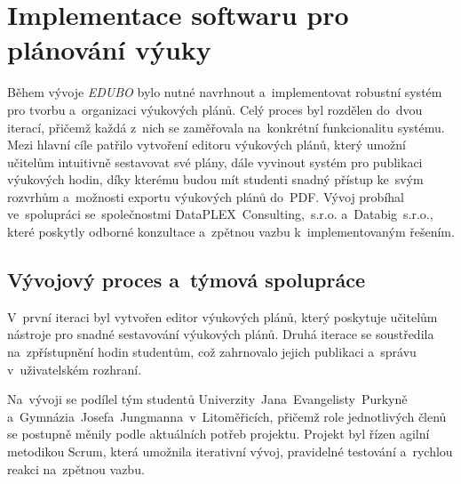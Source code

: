 \documentclass[male,czech,api_bc]{kitheses}
\begin{document}
\section{Implementace softwaru pro plánování výuky}

Během vývoje \textit{EDUBO} bylo nutné navrhnout a~implementovat robustní systém pro tvorbu a~organizaci výukových plánů. Celý proces byl rozdělen do~dvou iterací, přičemž každá z~nich se zaměřovala na~konkrétní funkcionalitu systému. Mezi hlavní cíle patřilo vytvoření editoru výukových plánů, který umožní učitelům intuitivně sestavovat své plány, dále vyvinout systém pro publikaci výukových hodin, díky kterému budou mít studenti snadný přístup ke~svým rozvrhům a~možnosti exportu výukových plánů do~PDF. Vývoj probíhal ve~spolupráci se~společnostmi DataPLEX~Consulting,~s.r.o. a~Databig~s.r.o., které poskytly odborné konzultace a~zpětnou vazbu k~implementovaným řešením.

\subsection{Vývojový proces a~týmová spolupráce}

V~první iteraci byl vytvořen editor výukových plánů, který poskytuje učitelům nástroje pro snadné sestavování výukových plánů. Druhá iterace se soustředila na~zpřístupnění hodin studentům, což zahrnovalo jejich publikaci a~správu v~uživatelském rozhraní.

Na~vývoji se podílel tým studentů Univerzity~Jana~Evangelisty~Purkyně a~Gymnázia~Josefa~Jungmanna~v~Litoměřicích, přičemž role jednotlivých členů se postupně měnily podle aktuálních potřeb projektu. Projekt byl řízen agilní metodikou Scrum, která umožnila iterativní vývoj, pravidelné testování a~rychlou reakci na~zpětnou vazbu.
\end{document}
